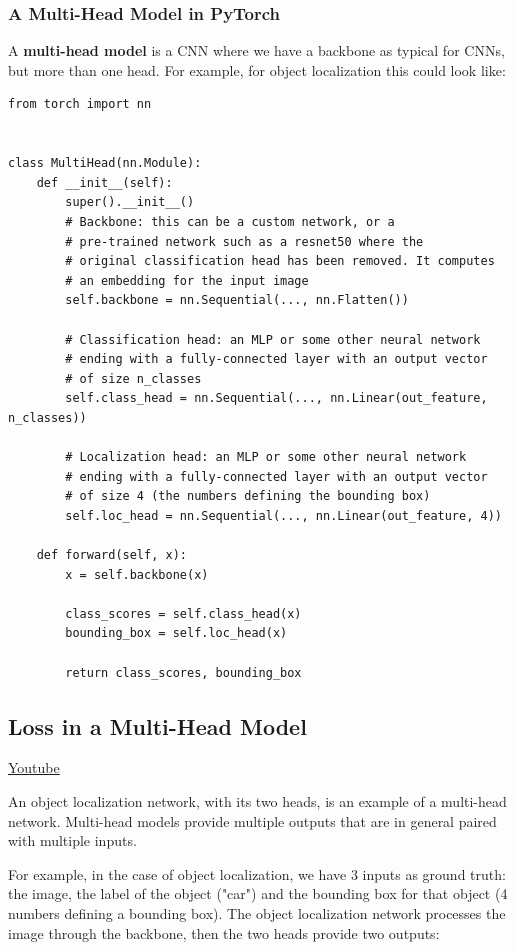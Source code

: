 \subsubsection{A Multi-Head Model in PyTorch}

A \textbf{multi-head model} is a CNN where we have a backbone as typical for CNNs, but more than one head. For example, for object localization this could look like:
\begin{lstlisting}
from torch import nn


class MultiHead(nn.Module):
    def __init__(self):
        super().__init__()
        # Backbone: this can be a custom network, or a
        # pre-trained network such as a resnet50 where the
        # original classification head has been removed. It computes
        # an embedding for the input image
        self.backbone = nn.Sequential(..., nn.Flatten())

        # Classification head: an MLP or some other neural network
        # ending with a fully-connected layer with an output vector
        # of size n_classes
        self.class_head = nn.Sequential(..., nn.Linear(out_feature, n_classes))

        # Localization head: an MLP or some other neural network
        # ending with a fully-connected layer with an output vector
        # of size 4 (the numbers defining the bounding box)
        self.loc_head = nn.Sequential(..., nn.Linear(out_feature, 4))

    def forward(self, x):
        x = self.backbone(x)

        class_scores = self.class_head(x)
        bounding_box = self.loc_head(x)

        return class_scores, bounding_box
\end{lstlisting}

\subsection{Loss in a Multi-Head Model}
\href{https://www.youtube.com/watch?v=dZAwj-_5FcE&t=1s&ab_channel=Udacity}{Youtube} \newline

An object localization network, with its two heads, is an example of a multi-head network. Multi-head models provide multiple outputs that are in general paired with multiple inputs. \newline

For example, in the case of object localization, we have 3 inputs as ground truth: the image, the label of the object ("car") and the bounding box for that object (4 numbers defining a bounding box). The object localization network processes the image through the backbone, then the two heads provide two outputs:

